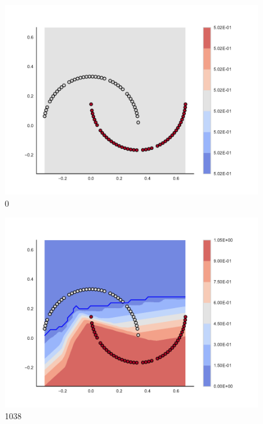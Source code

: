 
\begin{subfigure}[b]{0.09\textwidth}
    \includegraphics[clip, trim=2.35cm 1.75cm 4.5cm 0cm,width=\textwidth]{img/convergence/0.pdf}
    \caption{0}
    \label{fig:convergence_0}
\end{subfigure}
%
\begin{subfigure}[b]{0.09\textwidth}
    \includegraphics[clip, trim=2.35cm 1.75cm 4.5cm 0cm,width=\textwidth]{img/convergence/1038.pdf}
    \caption{1038}
    \label{fig:convergence_1038}
\end{subfigure}
%
